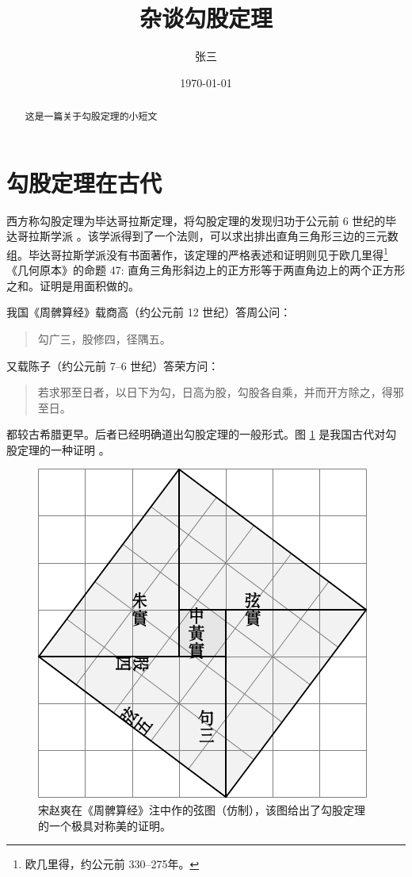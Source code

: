 \documentclass[UTF8]{ctexart}
\title{\heiti 杂谈勾股定理}
\author{\kaishu 张三}
\date{\today}
\newenvironment{myquote}
  {\begin{quote}\kaishu\zihao{-5}}
  {\end{quote}}
\begin{document}
\maketitle

\begin{abstract}
这是一篇关于勾股定理的小短文
\end{abstract}

\tableofcontents

\section{勾股定理在古代}
\label{sec:ancient}

西方称勾股定理为毕达哥拉斯定理，将勾股定理的发现归功于公元前 6 世纪的毕达哥拉斯学派 \cite{Kline}。该学派得到了一个法则，可以求出排出直角三角形三边的三元数组。毕达哥拉斯学派没有书面著作，该定理的严格表述和证明则见于欧几里得\footnote{欧几里得，约公元前 330--275年。}《几何原本》的命题 47: 直角三角形斜边上的正方形等于两直角边上的两个正方形之和。证明是用面积做的。

我国《周髀算经》载商高（约公元前 12 世纪）答周公问：
\begin{myquote}
勾广三，股修四，径隅五。
\end{myquote}
又载陈子（约公元前 7--6 世纪）答荣方问：
\begin{myquote}
若求邪至日者，以日下为勾，日高为股，勾股各自乘，并而开方除之，得邪至日。
\end{myquote}
都较古希腊更早。后者已经明确道出勾股定理的一般形式。图 \ref{fig:xiantu} 是我国古代对勾股定理的一种证明 \cite{quanjing}。

\begin{figure}[ht]
   \centering
   \includegraphics[scale=0.6]{xiantu.pdf}
   \caption{宋赵爽在《周髀算经》注中作的弦图（仿制），该图给出了勾股定理的一个极具对称美的证明。}
   \label{fig:xiantu}
\end{figure}
\end{document}
